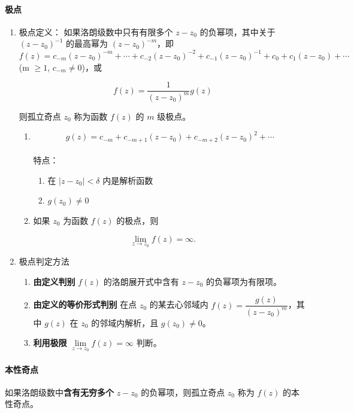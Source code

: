 \paragraph{极点}
\label{极点}
\begin{enumerate}
\item 极点定义：
\label{极点定义}
如果洛朗级数中只有有限多个 \(z-z_{0}\) 的负幂项，其中关于
\((z-z_{0})^{-1}\) 的最高幂为 \((z-z_{0})^{-m}\)，即
\(f(z)=c_{-m}(z-z_{0})^{-m}+\cdots+c_{-2}(z-z_{0})^{-2}+c_{-1}(z-z_{0})^{-1}+c_{0}+c_{1}(z-z_{0})+\cdots\)
(m \(\geqslant 1\), \(c_{-m}\neq 0\))，或

\[
f(z)=\frac{1}{(z-z_{0})^{m}}g(z)
\]

则孤立奇点 \(z_{0}\) 称为函数 \(f(z)\) 的 \(m\) 级极点。

\begin{tcolorbox}[title={说明},colback=red!5!white
,colframe=red!75!black
,colbacktitle=yellow!50!red
,coltitle=red!25!black, fonttitle=\bfseries,subtitle style={boxrule=0.4pt, colback=yellow!50!red!25!white}]
\begin{enumerate}
\item \[ g(z)=c_{-m}+c_{-m+1}(z-z_{0})+c_{-m+2}(z-z_{0})^{2}+\cdots \] \\
特点：
\begin{enumerate}
\item 在 \(|z-z_{0}|<\delta\) 内是解析函数
\item \(g(z_{0})\neq 0\)
\end{enumerate}
\item 如果 \(z_{0}\) 为函数 \(f(z)\) 的极点，则
\end{enumerate}

\[
\lim_{z\to z_{0}}f(z)=\infty.
\]

\end{tcolorbox}
\item 极点判定方法
\label{极点判定方法}
\begin{enumerate}
\item \textbf{由定义判别}
\(f(z)\) 的洛朗展开式中含有 \(z-z_{0}\) 的负幂项为有限项。
\item \textbf{由定义的等价形式判别}
在点 \(z_{0}\) 的某去心邻域内
\(f(z)=\dfrac{g(z)}{(z-z_{0})^{m}}\)，其中 \(g(z)\) 在 \(z_{0}\)
的邻域内解析，且 \(g(z_{0})\neq 0\)。
\item \textbf{利用极限} \(\lim\limits _{z\to z_{0}}f(z)=\infty\) 判断。
\end{enumerate}
\end{enumerate}
\paragraph{本性奇点}
\label{本性奇点}
如果洛朗级数中\textbf{含有无穷多个} \(z-z_{0}\) 的负幂项，则孤立奇点
\(z_{0}\) 称为 \(f(z)\) 的本性奇点。

